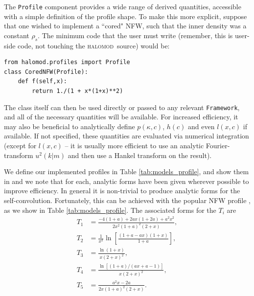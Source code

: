\documentclass[5p,aas_macros]{elsarticle}
\newcommand{\halomod}{\textsc{halomod}}
\newcommand{\framework}{\texttt{Framework}}
\begin{document}
The \verb|Profile| component provides a wide range of derived quantities, accessible with a simple definition of the profile shape. To make this more explicit, suppose that one wished to implement a ``cored" NFW, such that the inner density was a constant $\rho_s$. The minimum code that the user must write (remember, this is user-side code, not touching the \halomod\ source) would be:
\begin{verbatim}
from halomod.profiles import Profile
class CoredNFW(Profile):
    def f(self,x):
        return 1./(1 + x*(1+x)**2)
\end{verbatim}
The class itself can then be used directly or passed to any relevant \framework, and all of the necessary quantities will be available. For increased efficiency, it may also be beneficial to analytically define $p(\kappa,c)$, $h(c)$ and even $l(x,c)$ if available. If not specified, these quantities are evaluated via numerical integration (except for $l(x,c)$ -- it is usually more efficient to use an analytic Fourier-transform $u^2(k|m)$ and then use a Hankel transform on the result).

We define our implemented profiles in Table \ref{tab:models_profile}, and show them in and we note that for each, analytic forms have been given wherever possible to improve efficiency. In general it is non-trivial to produce analytic forms for the self-convolution. Fortunately, this can be achieved with the popular NFW profile \citep{Sheth2001a}, as we show in Table \ref{tab:models_profile}. The associated forms for the $T_i$ are
\begin{subequations}
    \label{eq:nfw_t}
    \begin{align}
        T_1 &= \frac{-4(1+a)+2ax(1+2a)+a^2x^2}{2x^2(1+a)^2(2+x)},\\
        T_2 &= \frac{1}{x^2}\ln\left[\frac{(1+a-ax)(1+x)}{1+a}\right], \\
        T_3 &= \frac{\ln(1+x)}{x(2+x)^2}, \\
        T_4 &= \frac{\ln[(1+a)/(ax+a-1)]}{x(2+x)^2}, \\
        T_5 &= \frac{a^2x-2a}{2x(1+a)^2(2+x)}.
    \end{align}
\end{subequations}
\end{document}
